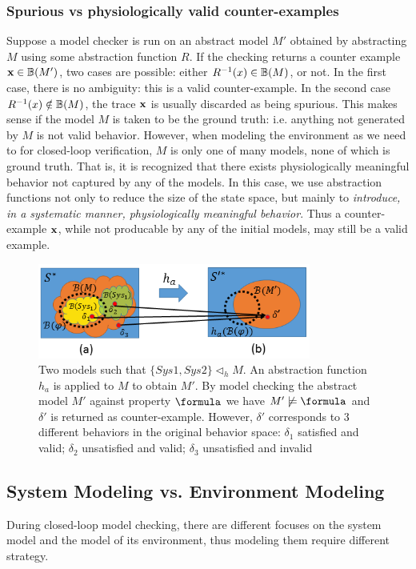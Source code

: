 \subsubsection{Spurious vs physiologically valid counter-examples}
Suppose a model checker is run on an abstract model $M'$ obtained by abstracting $M$ using some abstraction function $R$.
If the checking returns a counter example $\mathbf{x} \in \mathbb{B}(M')$, two cases are possible:
either $R^{-1}(x) \in \mathbb{B}(M)$, or not.
In the first case, there is no ambiguity: this is a valid counter-example.
In the second case $R^{-1}(x) \notin \mathbb{B}(M)$, the trace $\mathbf{x}$ is usually discarded as being spurious.
This makes sense if the model $M$ is taken to be the ground truth: i.e. anything not generated by $M$ is not valid behavior. 
However, when modeling the environment as we need to for closed-loop verification, $M$ is only one of many models, none of which is ground truth. 
That is, it is recognized that there exists physiologically meaningful behavior not captured by any of the models. 
In this case, we use abstraction functions not only to reduce the size of the state space, but mainly to \emph{introduce, in a systematic manner, physiologically meaningful behavior}. 
Thus a counter-example $\mathbf{x}$, while not producable by any of the initial models, may still be a valid example.
\begin{figure}[!t]
		\centering
		\includegraphics[width=0.8\textwidth]{figs/distinction.png}
		\caption{\small Two models such that $\{Sys1,Sys2\}\triangleleft_h M$. An abstraction function $h_a$ is applied to $M$ to obtain $M'$. By model checking the abstract model $M'$ against property $\formula$ we have $M'\not\models\formula$ and $\delta'$ is returned as counter-example. However, $\delta'$ corresponds to 3 different behaviors in the original behavior space: $\delta_1$ satisfied and valid; $\delta_2$ unsatisfied and valid; $\delta_3$ unsatisfied and invalid}
		\label{fig:ambiguity}
\end{figure}

\subsection{System Modeling vs. Environment Modeling}
During closed-loop model checking, there are different focuses on the system model and the model of its environment, thus modeling them require different strategy.

